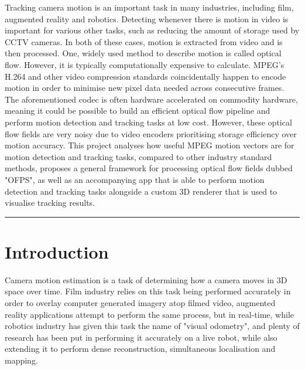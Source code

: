 \documentclass[11pt,english]{report}
\begin{document}
Tracking camera motion is an important task in many industries, including film, augmented reality and robotics. Detecting whenever there is motion in video is important for various other tasks, such as reducing the amount of storage used by CCTV cameras. In both of these cases, motion is extracted from video and is then processed. One, widely used method to describe motion is called optical flow. However, it is typically computationally expensive to calculate. MPEG's H.264 and other video compression standards coincidentally happen to encode motion in order to minimise new pixel data needed across consecutive frames. The aforementioned codec is often hardware accelerated on commodity hardware, meaning it could be possible to build an efficient optical flow pipeline and perform motion detection and tracking tasks at low cost. However, these optical flow fields are very noisy due to video encoders prioritising storage efficiency over motion accuracy. This project analyses how useful MPEG motion vectors are for motion detection and tracking tasks, compared to other industry standard methods, proposes a general framework for processing optical flow fields dubbed "OFPS", as well as an accompanying app that is able to perform motion detection and tracking tasks alongside a custom 3D renderer that is used to visualise tracking results.

\tableofcontents

\par\noindent\rule{\textwidth}{0.4pt}

\chapter{Introduction}

Camera motion estimation is a task of determining how a camera moves in 3D space over time. Film industry relies on this task being performed accurately in order to overlay computer generated imagery atop filmed video, augmented reality applications attempt to perform the same process, but in real-time, while robotics industry has given this task the name of "visual odometry", and plenty of research has been put in performing it accurately on a live robot, while also extending it to perform dense reconstruction, simultaneous localisation and mapping.
\end{document}
